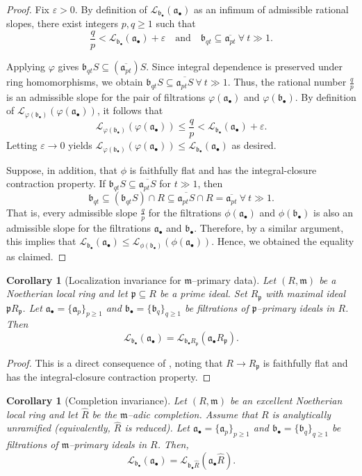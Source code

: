 \documentclass[12pt]{amsart}
\newcommand{\m}{\mathfrak m}
\newcommand{\p}{\mathfrak p}
\renewcommand{\a}{\mathfrak{a}}
\renewcommand{\b}{\mathfrak{b}}
\newcommand{\Loj}{\mathcal{L}} %
\newcommand{\abul}{{\a_\bullet}}
\newcommand{\bbul}{{\b_\bullet}}
\theoremstyle{plain}
\newtheorem{corollary}[theorem]{Corollary}
\theoremstyle{definition}
\numberwithin{equation}{section}
\begin{document}
\begin{proof}
	Fix $\varepsilon>0$.
	By definition of $\Loj_{\bbul}(\abul)$ as an infimum of admissible rational slopes,
	there exist integers $p,q\ge 1$ such that
	\[
	\frac{q}{p} < \Loj_{\bbul}(\abul)+\varepsilon
	\quad\text{and}\quad
	\b_{qt} \subseteq \overline{\a_{pt}} \ \forall \ t \gg 1.
	\]
	
	Applying $\varphi$ gives $\b_{qt} S \subseteq (\overline{\a_{pt}})S.$
	Since integral dependence is preserved under ring homomorphisms, 
	we obtain $\b_{qt} S \subseteq \overline{\a_{pt} S} \ \forall \ t \gg 1.$
	Thus, the rational number $\frac{q}{p}$ is an admissible slope for the pair of
	filtrations $\varphi(\abul)$ and $\varphi(\bbul)$.
	By definition of $\Loj_{\varphi(\bbul)}(\varphi(\abul))$, it follows that
	\[
	\Loj_{\varphi(\bbul)}(\varphi(\abul)) \le \frac{q}{p}
	< \Loj_{\bbul}(\abul)+\varepsilon.
	\]
	Letting $\varepsilon\to 0$ yields
	$\Loj_{\varphi(\bbul)}(\varphi(\abul)) \le \Loj_{\bbul}(\abul)$ as desired.

Suppose, in addition, that $\phi$ is faithfully flat and has the integral-closure contraction property. If $\b_{qt} S \subseteq \overline{\a_{pt} S}$ for $t \gg 1$, then
$$\b_{qt} \subseteq (\b_{qt} S) \cap R \subseteq \overline{\a_{pt} S} \cap R = \overline{\a_{pt}} \ \forall \ t \gg 1.$$
That is, every admissible slope $\frac{q}{p}$ for the filtrations $\phi(\abul)$ and $\phi(\bbul)$ is also an admissible slope for the filtrations $\abul$ and $\bbul$. Therefore, by a similar argument, this implies that $\Loj_{\bbul}(\abul) \le \Loj_{\phi(\bbul)}(\phi(\abul))$. Hence, we obtained the equality as claimed.
\end{proof}

\begin{corollary}[Localization invariance for $\m$--primary data]\label{prop:localization}
	Let $(R,\m)$ be a Noetherian local ring and let $\p\subseteq R$ be a prime ideal.
	Set $R_\p$ with maximal ideal $\p R_\p$.
	Let $\abul=\{\a_p\}_{p\ge1}$ and $\bbul=\{\b_q\}_{q\ge1}$ be filtrations of $\p$--primary ideals in $R$.
	Then
	\[
	\Loj_{\bbul}(\abul)=\Loj_{\bbul R_\p}(\abul R_\p).
	\]
\end{corollary}

\begin{proof}
	This is a direct consequence of , noting that $R \rightarrow R_\p$ is faithfully flat and has the integral-closure contraction property.
\end{proof}

\begin{corollary}[Completion invariance]\label{prop:completion}
	Let $(R,\m)$ be an excellent Noetherian local ring and let $\widehat R$ be the $\m$--adic completion.
	Assume that $R$ is analytically unramified (equivalently, $\widehat R$ is reduced).
	Let $\abul=\{\a_p\}_{p\ge1}$ and $\bbul=\{\b_q\}_{q\ge1}$ be filtrations of $\m$--primary ideals in $R$.
	Then,
	\[
	\Loj_{\bbul}(\abul)=\Loj_{\bbul\widehat R}(\abul\widehat R).
	\]
\end{corollary}
\end{document}
